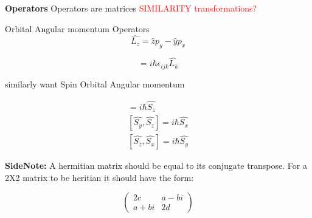 \documentclass{article}
\begin{document}
\vspace{5mm}

\textbf{Operators}
Operators are matrices\newline
\textcolor{red}{SIMILARITY transformations?}
\vspace{5mm}

Orbital Angular momentum Operators\newline
\begin{equation}
\hat{L_z}=\hat{z}p_y-\hat{y}p_x
\end{equation}

\begin{equation}
[\hat{L_i},\hat{L_j}]=i\hbar\epsilon_{ijk}\hat{L_k}
\end{equation}

similarly want Spin Orbital Angular momentum

\begin{align}
[\hat{S_x},\hat{S_y}]=i\hbar\hat{S_z}\\
[\hat{S_y},\hat{S_z}]=i\hbar\hat{S_x}\\
[\hat{S_z},\hat{S_x}]=i\hbar\hat{S_y}
\end{align}

\textbf{SideNote:} A hermitian matrix should be equal to its conjugate transpose. For a 2X2 matrix to be heritian it should have the form:

\[\left(\begin{array}{cc}
2c & a-bi \\
a+bi & 2d
\end{array}\right)\]
\end{document}
